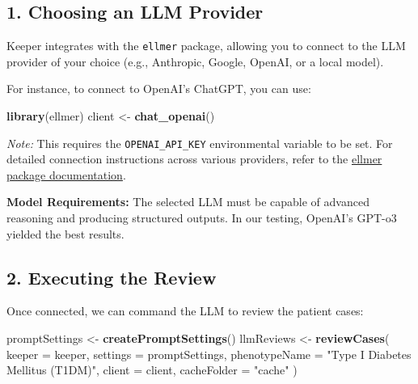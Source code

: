 \documentclass[
]{article}
\newenvironment{Shaded}{\begin{snugshade}}{\end{snugshade}}
\newcommand{\AttributeTok}[1]{\textcolor[rgb]{0.13,0.29,0.53}{#1}}
\newcommand{\FunctionTok}[1]{\textcolor[rgb]{0.13,0.29,0.53}{\textbf{#1}}}
\newcommand{\NormalTok}[1]{#1}
\newcommand{\OtherTok}[1]{\textcolor[rgb]{0.56,0.35,0.01}{#1}}
\newcommand{\StringTok}[1]{\textcolor[rgb]{0.31,0.60,0.02}{#1}}
\begin{document}
\subsection{1. Choosing an LLM Provider}\label{choosing-an-llm-provider}

Keeper integrates with the \texttt{ellmer} package, allowing you to
connect to the LLM provider of your choice (e.g., Anthropic, Google,
OpenAI, or a local model).

For instance, to connect to OpenAI's ChatGPT, you can use:

\begin{Shaded}
\begin{Highlighting}[]
\FunctionTok{library}\NormalTok{(ellmer)}
\NormalTok{client }\OtherTok{\textless{}{-}} \FunctionTok{chat\_openai}\NormalTok{()}
\end{Highlighting}
\end{Shaded}

\emph{Note:} This requires the \texttt{OPENAI\_API\_KEY} environmental
variable to be set. For detailed connection instructions across various
providers, refer to the \href{https://ellmer.tidyverse.org}{ellmer
package documentation}.

\textbf{Model Requirements:} The selected LLM must be capable of
advanced reasoning and producing structured outputs. In our testing,
OpenAI's GPT-o3 yielded the best results.

\subsection{2. Executing the Review}\label{executing-the-review}

Once connected, we can command the LLM to review the patient cases:

\begin{Shaded}
\begin{Highlighting}[]
\NormalTok{promptSettings }\OtherTok{\textless{}{-}} \FunctionTok{createPromptSettings}\NormalTok{()}
\NormalTok{llmReviews }\OtherTok{\textless{}{-}} \FunctionTok{reviewCases}\NormalTok{(}
  \AttributeTok{keeper =}\NormalTok{ keeper,}
  \AttributeTok{settings =}\NormalTok{ promptSettings,}
  \AttributeTok{phenotypeName =} \StringTok{"Type I Diabetes Mellitus (T1DM)"}\NormalTok{,}
  \AttributeTok{client =}\NormalTok{ client,}
  \AttributeTok{cacheFolder =} \StringTok{"cache"}
\NormalTok{)}
\end{Highlighting}
\end{Shaded}
\end{document}

